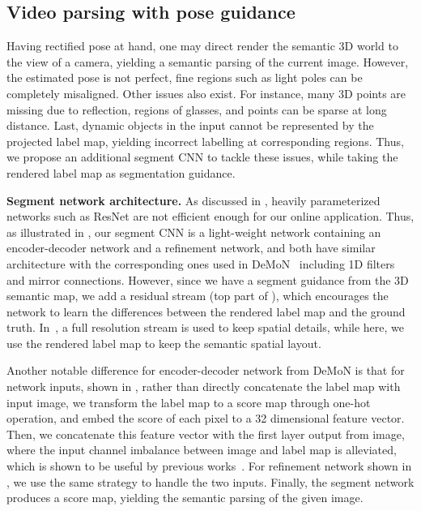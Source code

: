 \subsection{Video parsing with pose guidance}
\vspace{-0.3\baselineskip}
\label{subsec:parsing}
Having rectified pose at hand, one may direct render the semantic 3D world to the view of a camera, yielding a semantic parsing of the current image. However, the estimated pose is not perfect, fine regions such as light poles can be completely misaligned. Other issues also exist. For instance, many 3D points are missing due to reflection, \eg regions of glasses, and points can be sparse at long distance. Last, dynamic objects in the input cannot be represented by the projected label map, yielding incorrect labelling at corresponding regions. Thus, we propose an additional segment CNN to tackle these issues, while taking the rendered label map as segmentation guidance. 

\textbf{Segment network architecture.} As discussed in , heavily parameterized networks such as ResNet are not efficient enough for our online application. Thus, as illustrated in , our segment CNN is a light-weight network containing an encoder-decoder network and a refinement network, and both have similar architecture with the corresponding ones used in DeMoN~\cite{ummenhofer2016demon} including 1D filters and mirror connections. However, since we have a segment guidance from the 3D semantic map, we add a residual stream (top part of ), which encourages the network to learn the differences between the rendered label map and the ground truth. In~\cite{pohlen2016full}, a full resolution stream is used to keep spatial details, while here, we use the rendered label map to keep the semantic spatial layout.

Another notable difference for encoder-decoder network from DeMoN is that for network inputs, shown in , rather than directly concatenate the label map with input image, we transform the label map to a score map through one-hot operation, and embed the score of each pixel to a 32 dimensional feature vector. 
Then, we concatenate this feature vector with the first layer output from image, where the input channel imbalance between image and label map is alleviated, which is shown to be useful by previous works~\cite{eigen2015predicting}.
 For refinement network shown in , we use the same strategy to handle the two inputs. 
 Finally, the segment network produces a score map, yielding the semantic parsing of the given image.


